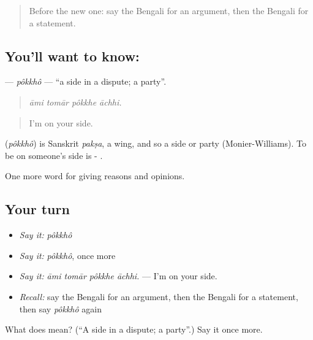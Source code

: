 \begin{quote}
Before the new one: say the Bengali for an argument, then the Bengali for a statement.
\end{quote}

\subsection*{You'll want to know: }
\textbf{} — \emph{pôkkhô} — \textquotedblleft{}a side in a dispute; a party\textquotedblright{}.

\begin{quote}
   
\end{quote}

\begin{quote}
\emph{āmi tomār pôkkhe āchhi.}
\end{quote}

\begin{quote}
I'm on your side.
\end{quote}

\begin{cousinweb}
\textbf{} (\emph{pôkkhô}) is Sanskrit \emph{pakṣa}, a wing, and so a side or party (Monier-Williams). To be on someone's side is -  .
\end{cousinweb}

\begin{grammarlens}[title={What you've built}]
One more word for giving reasons and opinions.
\end{grammarlens}

\subsection*{Your turn}
\begin{itemize}
\raggedright
  \item \emph{Say it:} \emph{pôkkhô}
  \item \emph{Say it:} \emph{pôkkhô}, once more
  \item \emph{Say it:} \emph{āmi tomār pôkkhe āchhi.} — I'm on your side.
  \item \emph{Recall:} say the Bengali for an argument, then the Bengali for a statement, then say \emph{pôkkhô} again
\end{itemize}

\begin{tcolorbox}[breakable,colback=teal!4,colframe=teal!35!black,title={Before you move on}]
What does  mean? (\textquotedblleft{}A side in a dispute; a party\textquotedblright{}.) Say it once more.
\end{tcolorbox}

